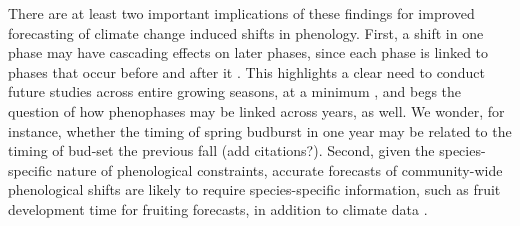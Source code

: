 \documentclass{article}
\begin{document}



\par There are at least two important implications of these findings for improved forecasting of climate change induced shifts in phenology. First, a shift in one phase may have cascading effects on later phases, since each phase is linked to phases that occur before and after it \citep{wolkovich2014b}. This highlights a clear need to conduct future studies across entire growing seasons, at a minimum \citep{wolkovich2014}, and begs the question of how phenophases may be linked across years, as well. We wonder, for instance, whether the timing of spring budburst in one year may be related to the timing of bud-set the previous fall (add citations?). Second, given the species-specific nature of phenological constraints, accurate forecasts of community-wide phenological shifts are likely to require species-specific information, such as fruit development time for fruiting forecasts, in addition to climate data \citep{diez2012}. %
\end{document}
